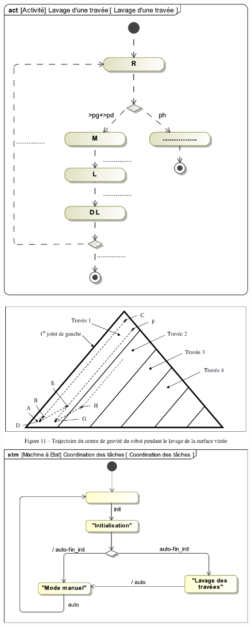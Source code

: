\vspace{2cm}

\begin{center}
 \includegraphics[width=0.7\linewidth]{img/Lavage_travee}
\end{center}





\begin{center}
 \includegraphics[width=0.7\linewidth]{img/Figure11}
  \includegraphics[width=0.7\linewidth]{img/Coordination_taches}
\end{center}


